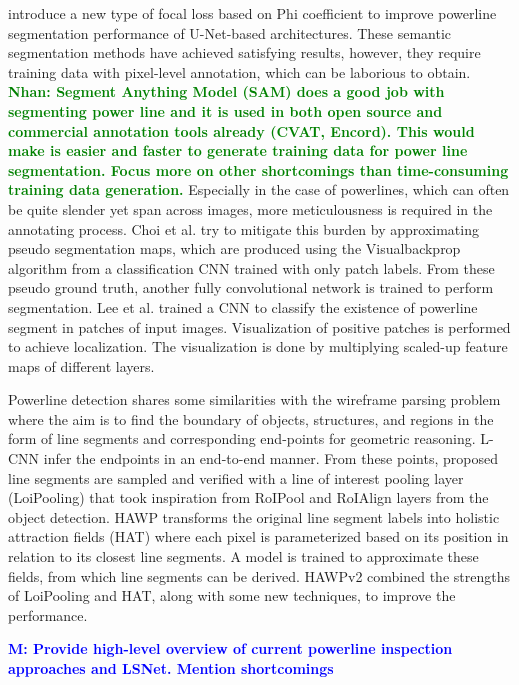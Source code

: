 \documentclass[journal]{IEEEtran}
\newcommand{\commentM}[1]{\textbf{\textcolor{blue}{M: #1}}}
\newcommand{\commentN}[1]{\textbf{\textcolor{green}{Nhan: #1}}}
\begin{document}
introduce a new type of focal loss based on Phi coefficient \cite{phi_coeff} to improve powerline segmentation performance of U-Net\cite{unet}-based architectures. These semantic segmentation methods have achieved satisfying results, however, they require training data with pixel-level annotation, which can be laborious to obtain. \commentN{Segment Anything Model (SAM) does a good job with segmenting power line and it is used in both open source and commercial annotation tools already (CVAT, Encord). This would make is easier and faster to generate training data for power line segmentation. Focus more on other shortcomings than time-consuming training data generation.} Especially in the case of powerlines, which can often be quite slender yet span across images, more meticulousness is required in the annotating process. Choi et al. \cite{related_work_hyeyeon_choi_2021} try to mitigate this burden by approximating pseudo segmentation maps, which are produced using the Visualbackprop algorithm \cite{vbp} from a classification CNN trained with only patch labels. From these pseudo ground truth, another fully convolutional network is trained to perform segmentation. Lee et al. \cite{related_work_sang_jun_lee_2017} trained a CNN to classify the existence of powerline segment in patches of input images. Visualization of positive patches is performed to achieve localization. The visualization is done by multiplying scaled-up feature maps of different layers.

Powerline detection shares some similarities with the wireframe parsing problem where the aim is to find the boundary of objects, structures, and regions in the form of line segments and corresponding end-points for geometric reasoning. L-CNN \cite{lcnn} infer the endpoints in an end-to-end manner. From these points, proposed line segments are sampled and verified with a line of interest pooling layer (LoiPooling) that took inspiration from RoIPool \cite{fastrcnn} and RoIAlign \cite{maskrcnn} layers from the object detection. HAWP \cite{hawp} transforms the original line segment labels into holistic attraction fields (HAT) where each pixel is parameterized based on its position in relation to its closest line segments. A model is trained to approximate these fields, from which line segments can be derived. HAWPv2 \cite{hawpv2} combined the strengths of LoiPooling and HAT, along with some new techniques, to improve the performance.  

\commentM{Provide high-level overview of current powerline inspection approaches and LSNet. Mention shortcomings}
\end{document}
